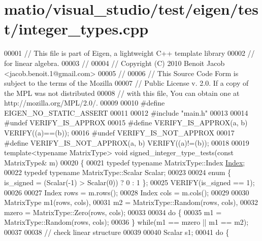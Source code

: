 \hypertarget{matio_2visual__studio_2test_2eigen_2test_2integer__types_8cpp_source}{}\section{matio/visual\+\_\+studio/test/eigen/test/integer\+\_\+types.cpp}
\label{matio_2visual__studio_2test_2eigen_2test_2integer__types_8cpp_source}

\begin{DoxyCode}
00001 \textcolor{comment}{// This file is part of Eigen, a lightweight C++ template library}
00002 \textcolor{comment}{// for linear algebra.}
00003 \textcolor{comment}{//}
00004 \textcolor{comment}{// Copyright (C) 2010 Benoit Jacob <jacob.benoit.1@gmail.com>}
00005 \textcolor{comment}{//}
00006 \textcolor{comment}{// This Source Code Form is subject to the terms of the Mozilla}
00007 \textcolor{comment}{// Public License v. 2.0. If a copy of the MPL was not distributed}
00008 \textcolor{comment}{// with this file, You can obtain one at http://mozilla.org/MPL/2.0/.}
00009 
00010 \textcolor{preprocessor}{#define EIGEN\_NO\_STATIC\_ASSERT}
00011 
00012 \textcolor{preprocessor}{#include "main.h"}
00013 
00014 \textcolor{preprocessor}{#undef VERIFY\_IS\_APPROX}
00015 \textcolor{preprocessor}{#define VERIFY\_IS\_APPROX(a, b) VERIFY((a)==(b));}
00016 \textcolor{preprocessor}{#undef VERIFY\_IS\_NOT\_APPROX}
00017 \textcolor{preprocessor}{#define VERIFY\_IS\_NOT\_APPROX(a, b) VERIFY((a)!=(b));}
00018 
00019 \textcolor{keyword}{template}<\textcolor{keyword}{typename} MatrixType> \textcolor{keywordtype}{void} signed\_integer\_type\_tests(\textcolor{keyword}{const} MatrixType& m)
00020 \{
00021   \textcolor{keyword}{typedef} \textcolor{keyword}{typename} MatrixType::Index \hyperlink{namespace_eigen_a62e77e0933482dafde8fe197d9a2cfde}{Index};
00022   \textcolor{keyword}{typedef} \textcolor{keyword}{typename} MatrixType::Scalar Scalar;
00023 
00024   \textcolor{keyword}{enum} \{ is\_signed = (Scalar(-1) > Scalar(0)) ? 0 : 1 \};
00025   VERIFY(is\_signed == 1);
00026 
00027   Index rows = m.rows();
00028   Index cols = m.cols();
00029 
00030   MatrixType m1(rows, cols),
00031              m2 = MatrixType::Random(rows, cols),
00032              mzero = MatrixType::Zero(rows, cols);
00033 
00034   \textcolor{keywordflow}{do} \{
00035     m1 = MatrixType::Random(rows, cols);
00036   \} \textcolor{keywordflow}{while}(m1 == mzero || m1 == m2);
00037 
00038   \textcolor{comment}{// check linear structure}
00039 
00040   Scalar s1;
00041   \textcolor{keywordflow}{do} \{

\end{DoxyCode}
